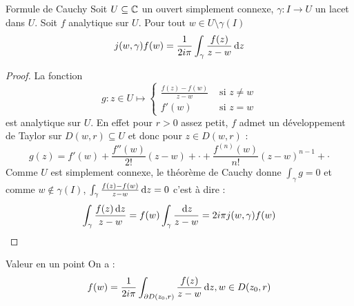 \documentclass{cours}
\begin{document}
\begin{théorème}{Formule de Cauchy}{}
    Soit $U \subseteq \mathbb{C}$ un ouvert simplement connexe, $\gamma : I \to U$ un lacet dans $U$. Soit $f$ analytique sur $U$. Pour tout $w \in U \setminus \gamma(I)$
    \[
        j(w, \gamma)f(w) = \frac{1}{2i\pi}\int_{\gamma}\frac{f(z)}{z - w}{\rm \, d} z
    \]
\end{théorème}
\begin{proof}
    La fonction
    \[
        g : z \in U \mapsto \begin{cases}
            \frac{f(z)-f(w)}{z-w} & \text{ si } z \neq w\\
            f'(w) & \text{ si } z = w
        \end{cases}
    \]
    est analytique sur $U$. En effet pour $r > 0$ assez petit, $f$ admet un développement de Taylor sur $D(w, r) \subseteq U$ et donc pour $z \in D(w, r)$ :
    \[
        g(z) = f'(w) + \frac{f''(w)}{2!}(z - w) + \cdot + \frac{f^{(n)}(w)}{n!}\left(z - w\right)^{n - 1} + \cdot
    \]
    Comme $U$ est simplement connexe, le théorème de Cauchy donne $\int_{\gamma} g = 0$ et comme $w \notin \gamma(I)$, $\int_{\gamma}\frac{f(z) - f(w)}{z - w}{\rm \, d} z = 0$ c'est à dire : 
    \[
        \int_{\gamma}\frac{f(z){\rm \, d} z}{z - w} = f(w)\int_{\gamma}\frac{{\rm \, d} z}{z - w} = 2i\pi j(w, \gamma)f(w)
    \]
\end{proof}

\begin{corollaire}{Valeur en un point}{}
    On a : 
    \[
        f(w) = \frac{1}{2i\pi}\int_{\partial D(z_{0}, r)}\frac{f(z)}{z-w}{\rm \, d} z, w \in D(z_{0}, r)
    \]
\end{corollaire}
\end{document}
